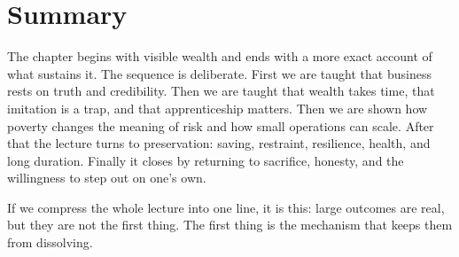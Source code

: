 \section{Summary}

The chapter begins with visible wealth and ends with a more exact account of what sustains it. The sequence is deliberate. First we are taught that business rests on truth and credibility. Then we are taught that wealth takes time, that imitation is a trap, and that apprenticeship matters. Then we are shown how poverty changes the meaning of risk and how small operations can scale. After that the lecture turns to preservation: saving, restraint, resilience, health, and long duration. Finally it closes by returning to sacrifice, honesty, and the willingness to step out on one's own.

If we compress the whole lecture into one line, it is this: large outcomes are real, but they are not the first thing. The first thing is the mechanism that keeps them from dissolving.